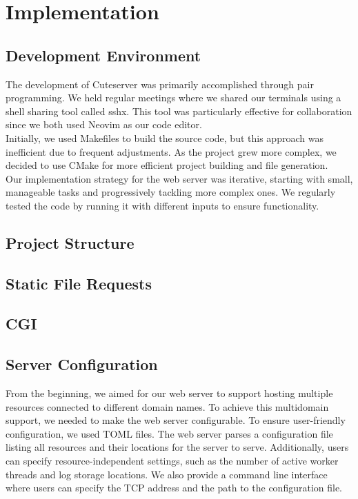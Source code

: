 \section*{Implementation}

\subsection*{Development Environment} 
The development of Cuteserver was primarily accomplished through pair programming. We held regular meetings where we shared our terminals using a shell sharing tool called sshx. This tool was particularly effective for collaboration since we both used Neovim as our code editor. \\

Initially, we used Makefiles to build the source code, but this approach was inefficient due to frequent adjustments. As the project grew more complex, we decided to use CMake for more efficient project building and file generation. \\

Our implementation strategy for the web server was iterative, starting with small, manageable tasks and progressively tackling more complex ones. We regularly tested the code by running it with different inputs to ensure functionality.


\subsection*{Project Structure} %

\subsection*{Static File Requests}

\subsection*{CGI}

\subsection*{Server Configuration}
From the beginning, we aimed for our web server to support hosting multiple resources connected to different domain names. To achieve this multidomain support, we needed to make the web server configurable. To ensure user-friendly configuration, we used TOML files. The web server parses a configuration file listing all resources and their locations for the server to serve. Additionally, users can specify resource-independent settings, such as the number of active worker threads and log storage locations. We also provide a command line interface where users can specify the TCP address and the path to the configuration file.


